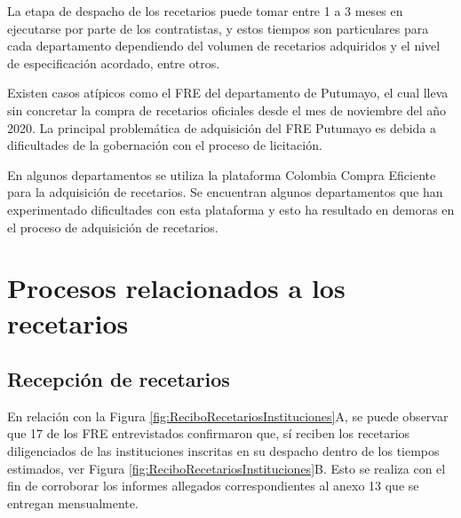 \documentclass[
]{book}
\begin{document}
La etapa de despacho de los recetarios puede tomar entre 1 a 3 meses en ejecutarse por parte de los contratistas, y estos tiempos son particulares para cada departamento dependiendo del volumen de recetarios adquiridos y el nivel de especificación acordado, entre otros.

Existen casos atípicos como el FRE del departamento de Putumayo, el cual lleva sin concretar la compra de recetarios oficiales desde el mes de noviembre del año 2020. La principal problemática de adquisición del FRE Putumayo es debida a dificultades de la gobernación con el proceso de licitación.

En algunos departamentos se utiliza la plataforma Colombia Compra Eficiente para la adquisición de recetarios. Se encuentran algunos departamentos que han experimentado dificultades con esta plataforma y esto ha resultado en demoras en el proceso de adquisición de recetarios.

\hypertarget{procesos-relacionados-a-los-recetarios}{%
\section{Procesos relacionados a los recetarios}\label{procesos-relacionados-a-los-recetarios}}


\hypertarget{recepciuxf3n-de-recetarios}{%
\subsection{Recepción de recetarios}\label{recepciuxf3n-de-recetarios}}

En relación con la Figura \ref{fig:ReciboRecetariosInstituciones}A, se puede observar que 17 de los FRE entrevistados confirmaron que, sí reciben los recetarios diligenciados de las instituciones inscritas en su despacho dentro de los tiempos estimados, ver Figura \ref{fig:ReciboRecetariosInstituciones}B. Esto se realiza con el fin de corroborar los informes allegados correspondientes al anexo 13 que se entregan mensualmente.
\end{document}
